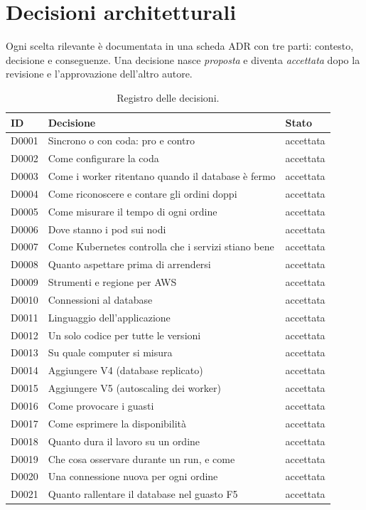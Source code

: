 \chapter{Decisioni architetturali}
\label{cap:decisioni}

Ogni scelta rilevante è documentata in una scheda ADR con tre parti: contesto, decisione e conseguenze. Una decisione nasce \emph{proposta} e diventa \emph{accettata} dopo la revisione e l'approvazione dell'altro autore.

\begin{table}[htbp]
\centering
\caption{Registro delle decisioni.}
\label{tab:registro-decisioni}
\begin{tabularx}{\linewidth}{@{}lLl@{}}
\toprule
\textbf{ID} & \textbf{Decisione} & \textbf{Stato} \\
\midrule
D0001 & Sincrono o con coda: pro e contro & accettata \\
D0002 & Come configurare la coda & accettata \\
D0003 & Come i worker ritentano quando il database è fermo & accettata \\
D0004 & Come riconoscere e contare gli ordini doppi & accettata \\
D0005 & Come misurare il tempo di ogni ordine & accettata \\
D0006 & Dove stanno i pod sui nodi & accettata \\
D0007 & Come Kubernetes controlla che i servizi stiano bene & accettata \\
D0008 & Quanto aspettare prima di arrendersi & accettata \\
D0009 & Strumenti e regione per AWS & accettata \\
D0010 & Connessioni al database & accettata \\
D0011 & Linguaggio dell'applicazione & accettata \\
D0012 & Un solo codice per tutte le versioni & accettata \\
D0013 & Su quale computer si misura & accettata \\
D0014 & Aggiungere V4 (database replicato) & accettata \\
D0015 & Aggiungere V5 (autoscaling dei worker) & accettata \\
D0016 & Come provocare i guasti & accettata \\
D0017 & Come esprimere la disponibilità & accettata \\
D0018 & Quanto dura il lavoro su un ordine & accettata \\
D0019 & Che cosa osservare durante un run, e come & accettata \\
D0020 & Una connessione nuova per ogni ordine & accettata \\
D0021 & Quanto rallentare il database nel guasto F5 & accettata \\
\bottomrule
\end{tabularx}
\end{table}


